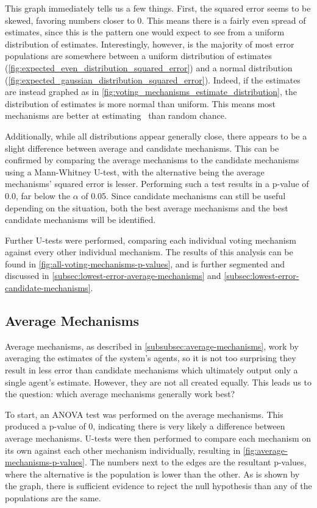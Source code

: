 This graph immediately tells us a few things.
First, the squared error seems to be skewed, favoring numbers closer to 0.
This means there is a fairly even spread of estimates, since this is the
pattern one would expect to see from a uniform distribution of estimates.
Interestingly, however, is the majority of most error populations are
somewhere between a uniform distribution of estimates
(\autoref{fig:expected_even_distribution_squared_error}) and a normal
distribution (\autoref{fig:expected_gaussian_distribution_squared_error}).
Indeed, if the estimates are instead graphed as in
\autoref{fig:voting_mechanisms_estimate_distribution}, the distribution of estimates
is more normal than uniform.
This means most mechanisms are better at estimating \truth\ than random chance.

Additionally, while all distributions appear generally close, there appears to be a
slight difference between average and candidate mechanisms.
This can be confirmed by comparing the average mechanisms to the candidate mechanisms
using a Mann-Whitney U-test, with the alternative being the average mechanisms'
squared error is lesser.
Performing such a test results in a p-value of 0.0, far below the $\alpha$ of 0.05.
Since candidate mechanisms can still be useful depending on the situation, both the
best average mechanisms and the best candidate mechanisms will be identified.

Further U-tests were performed, comparing each individual voting mechanism against
every other individual mechanism.
The results of this analysis can be found in
\autoref{fig:all-voting-mechanisms-p-values}, and is further segmented and discussed in
\autoref{subsec:lowest-error-average-mechanisms} and
\autoref{subsec:lowest-error-candidate-mechanisms}.

\subsection{Average Mechanisms}\label{subsec:lowest-error-average-mechanisms}
Average mechanisms, as described in \autoref{subsubsec:average-mechanisms}, work by
averaging the estimates of the system's agents, so it is not too surprising they
result in less error than candidate mechanisms which ultimately output only a single
agent's estimate.
However, they are not all created equally.
This leads us to the question: which average mechanisms generally work best?

To start, an ANOVA test was performed on the average mechanisms.
This produced a p-value of 0, indicating there is very likely a difference between
average mechanisms.
U-tests were then performed to compare each mechanism on its own against each other
mechanism individually, resulting in \autoref{fig:average-mechanisms-p-values}.
The numbers next to the edges are the resultant p-values, where the alternative is
the population is lower than the other.
As is shown by the graph, there is sufficient evidence to reject the null hypothesis
than any of the populations are the same.

